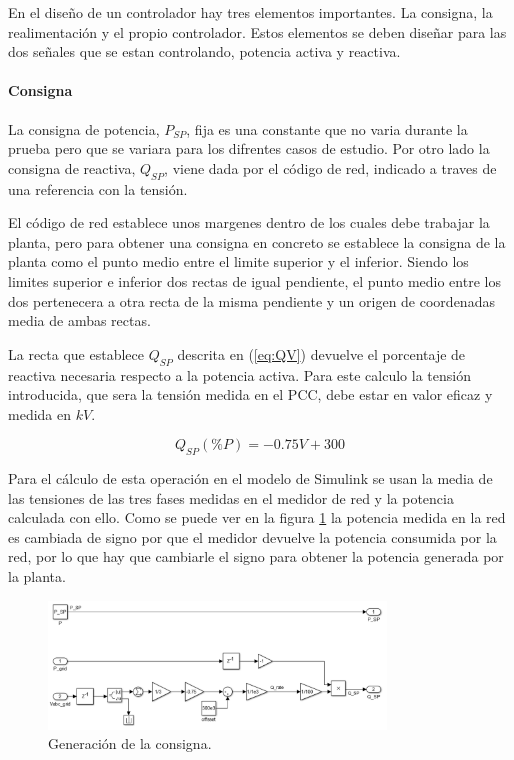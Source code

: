 \documentclass{book}
\begin{document}
En el diseño de un controlador hay tres elementos importantes. La consigna, la realimentaci\'on y el propio controlador. Estos elementos se deben diseñar para las dos señales que se estan controlando, potencia activa y reactiva. \par

		\paragraph{Consigna}

La consigna de potencia, $P_{SP}$, fija es una constante que no varia durante la prueba pero que se variara para los difrentes casos de estudio. Por otro lado la consigna de reactiva, $Q_{SP}$, viene dada por el c\'odigo de red, indicado a traves de una referencia con la tensi\'on. \par

El c\'odigo de red establece unos margenes dentro de los cuales debe trabajar la planta, pero para obtener una consigna en concreto se establece la consigna de la planta como el punto medio entre el limite superior y el inferior. Siendo los limites superior e inferior dos rectas de igual pendiente, el punto medio entre los dos pertenecera a otra recta de la misma pendiente y un origen de coordenadas media de ambas rectas. \par

La recta que establece $Q_{SP}$ descrita en (\ref{eq:QV}) devuelve el porcentaje de reactiva necesaria respecto a la potencia activa. Para este calculo la tensi\'on introducida, que sera la tensi\'on medida en el PCC, debe estar en valor eficaz y medida en $kV$.  

\begin{equation}\label{eq:QV}
	Q_{SP}(\%P)= -0.75V +300 
\end{equation} \par

Para el c\'alculo de esta operaci\'on en el modelo de Simulink se usan la media de las tensiones de las tres fases medidas en el medidor de red y la potencia calculada con ello. Como se puede ver en la figura \ref{SP_Sim} la potencia medida en la red es cambiada de signo por que el medidor devuelve la potencia consumida por la red, por lo que hay que cambiarle el signo para obtener la potencia generada por la planta. 

\begin{figure}[h!]
\centering
\includegraphics[width=0.8\textwidth]{SP_Sim.PNG}
\caption{Generaci\'on de la consigna. }
\label{SP_Sim}
\end{figure} \par
\end{document}
